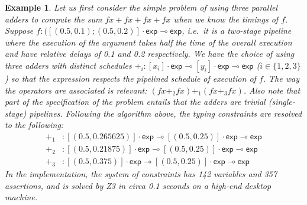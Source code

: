 \documentclass{article}
\newcommand{\lexpt}{\mathsf{exp}}
\newtheorem{example}[theorem]{Example}
\begin{document}
\begin{example}\label{ex:fx4}
Let us first consider the simple problem of using three parallel adders to compute the sum $f x + f x + f x + f x$ when we know the timings of $f$. Suppose $f:([(0.5, 0.1);(0.5, 0.2)]\cdot \lexpt\multimap \lexpt$, i.e.\ it is a two-stage pipeline where the execution of the argument takes half the time of the overall execution and have relative delays of 0.1 and 0.2 respectively. We have the choice of using three adders with distinct schedules $+_i:[x_i]\cdot\lexpt\multimap [y_i]\cdot\lexpt\multimap\lexpt$ ($i\in\{1,2,3\}$) so that the expression respects the pipelined schedule of execution of $f$. The way the operators are associated is relevant: $(f x +_2 f x) +_1 (f x +_3 f x)$. Also note that part of the specification of the problem entails that the adders are trivial (single-stage) pipelines. Following the algorithm above, the typing constraints are resolved to the following:
\begin{align*}
+_1 &:[(0.5, 0.265625)]\cdot\lexpt \multimap [(0.5, 0.25)]\cdot\lexpt\multimap\lexpt\\
+_2 &:[(0.5, 0.21875)]\cdot\lexpt \multimap [(0.5, 0.25)]\cdot\lexpt\multimap\lexpt\\
+_3 &:[(0.5, 0.375)]\cdot\lexpt \multimap [(0.5, 0.25)]\cdot\lexpt\multimap\lexpt
\end{align*}
In the implementation, the system of constraints has 142 variables and 357 assertions, and is solved by Z3 in circa 0.1 seconds on a high-end desktop machine.
\end{example}
\end{document}
